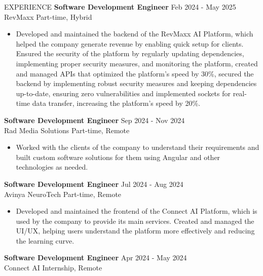 \documentclass{resume}
\begin{document}
\vspace{-0.4em}
\begin{rSection}{EXPERIENCE}
  {\bf Software Development Engineer} \hfill {Feb 2024 - May 2025}\\
  RevMaxx \hfill {Part-time, Hybrid}
  \vspace{-0.4em}
  \begin{itemize}
    \item{Developed and maintained the backend of the RevMaxx AI Platform, which helped the company generate revenue by enabling quick setup for clients. Ensured the security of the platform by regularly updating dependencies, implementing proper security measures, and monitoring the platform, created and managed APIs that optimized the platform's speed by 30\%, secured the backend by implementing robust security measures and keeping dependencies up-to-date, ensuring zero vulnerabilities and implemented sockets for real-time data transfer, increasing the platform's speed by 20\%.}
  \end{itemize}
  \vspace{-0.4em}
  {\bf Software Development Engineer} \hfill {Sep 2024 - Nov 2024}\\
  Rad Media Solutions \hfill {Part-time, Remote}
  \vspace{-0.4em}
  \begin{itemize}
    \item{Worked with the clients of the company to understand their requirements and built custom software solutions for them using Angular and other technologies as needed.}
  \end{itemize}
  \vspace{-0.4em}
  {\bf Software Development Engineer} \hfill {Jul 2024 - Aug 2024}\\
  Avinya NeuroTech \hfill {Part-time, Remote}
  \vspace{-0.4em}
  \begin{itemize}
    \item{Developed and maintained the frontend of the Connect AI Platform, which is used by the company to provide its main services. Created and managed the UI/UX, helping users understand the platform more effectively and reducing the learning curve.}
  \end{itemize}
  \vspace{-0.4em}
  {\bf Software Development Engineer} \hfill {Apr 2024 - May 2024}\\
  Connect AI \hfill {Internship, Remote}
  \vspace{-0.4em}

\end{rSection}
\end{document}
